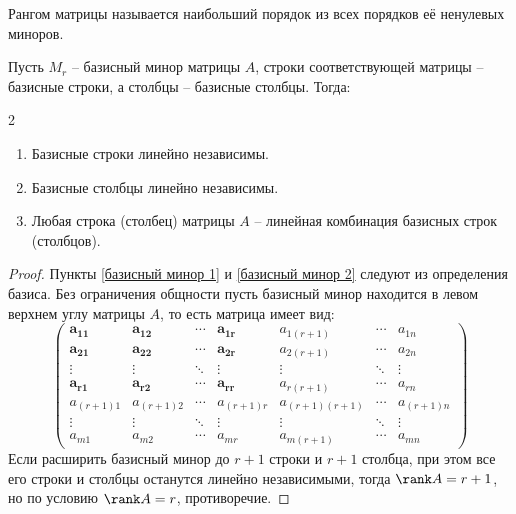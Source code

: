 \documentclass[12pt]{article}
\begin{document}
\begin{definition}
    Рангом матрицы называется наибольший порядок из всех порядков её ненулевых миноров.
\end{definition}
\begin{theorem}
    Пусть $M_r$ – базисный минор матрицы $A$, строки соответствующей матрицы – базисные строки, а столбцы – базисные столбцы. Тогда:
    \begin{multicols}{2}
        \begin{enumerate}
        \item \label{базисный минор 1} Базисные строки линейно независимы.
        \item \label{базисный минор 2} Базисные столбцы линейно независимы.
        \item Любая строка (столбец) матрицы $A$ – линейная комбинация базисных строк (столбцов).
    \end{enumerate}
    \end{multicols}
\end{theorem}
\begin{proof}
    Пункты \ref{базисный минор 1} и \ref{базисный минор 2} следуют из определения базиса. Без ограничения общности пусть базисный минор находится в левом верхнем углу матрицы $A$, то есть матрица имеет вид:
    $$\begin{pmatrix}
        \boldsymbol{a_{11}} & \boldsymbol{a_{12}} & \cdots & \boldsymbol{a_{1r}} & a_{1(r+1)} & \cdots & a_{1n}\\
        \boldsymbol{a_{21}} & \boldsymbol{a_{22}} & \cdots & \boldsymbol{a_{2r}} & a_{2(r+1)} & \cdots & a_{2n}\\
        \vdots & \vdots & \ddots & \vdots & \vdots & \ddots & \vdots\\
        \boldsymbol{a_{r1}} & \boldsymbol{a_{r2}} & \cdots & \boldsymbol{a_{rr}} & a_{r(r+1)} & \cdots & a_{rn}\\
        a_{(r+1)1} & a_{(r+1)2} & \cdots & a_{(r+1)r} & a_{(r+1)(r+1)} & \cdots & a_{(r+1)n}\\
        \vdots & \vdots & \ddots & \vdots & \vdots & \ddots & \vdots\\
        a_{m1} & a_{m2} & \cdots & a_{mr} & a_{m(r+1)} & \cdots & a_{mn}
    \end{pmatrix}$$
    Если расширить базисный минор до $r+1$ строки и $r+1$ столбца, при этом все его строки и столбцы останутся линейно независимыми, тогда $\rank A=r+1$, но по условию $\rank A=r$, противоречие.
\end{proof}
\end{document}
